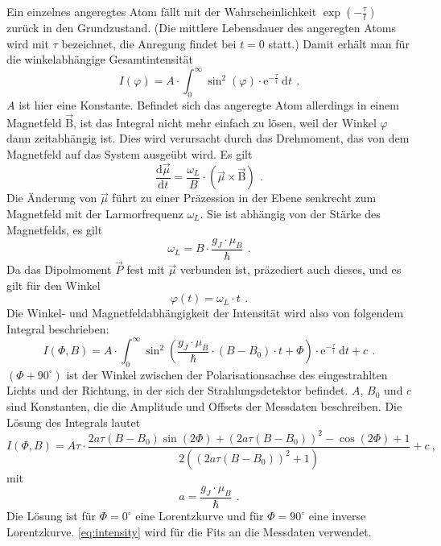 Ein einzelnes angeregtes Atom fällt mit der Wahrscheinlichkeit $\exp(-\frac{\tau}{t})$ zurück in den Grundzustand.
(Die mittlere Lebensdauer des angeregten Atoms wird mit $\tau$ bezeichnet, die Anregung findet bei $t = 0$ statt.)
Damit erhält man für die winkelabhängige Gesamtintensität
\begin{equation}
\label{eq:int}
I(\varphi) = A \cdot \int_0^{\infty} \sin^2(\varphi) \cdot \text{e}^{-\frac{\tau}{t}} \ \text{d}t \, \ .
\end{equation}
$A$ ist hier eine Konstante. Befindet sich das angeregte Atom allerdings in einem Magnetfeld $\vec{\text{B}}$,
ist das Integral nicht mehr einfach zu lösen, weil der Winkel $\varphi$ dann zeitabhängig ist.
Dies wird verursacht durch das Drehmoment, das von dem Magnetfeld auf das System ausgeübt wird.
Es gilt
\begin{equation}
\label{eq:dmu}
\frac{\text{d}\vec{\mu}}{\text{d}t} = \frac{\omega_L}{B} \cdot (\vec{\mu} \times \vec{\text{B}}) \ \, .
\end{equation}
Die Änderung von $\vec{\mu}$  führt zu einer Präzession in der Ebene senkrecht zum Magnetfeld
mit der Larmorfrequenz $\omega_L$.
Sie ist abhängig von der Stärke des Magnetfelds, es gilt
\begin{equation}
\label{eq:larmorfreq}
\omega_L = B \cdot \frac{g_J \cdot \mu_B}{\hbar} \ \, .
\end{equation}
Da das Dipolmoment $\vec{P}$ fest mit $\vec{\mu}$ verbunden ist, präzediert auch dieses, und es gilt für den
Winkel
\begin{equation}
\label{eq:phit}
\varphi(t) = \omega_L \cdot t \ \, .
\end{equation}
Die Winkel- und Magnetfeldabhängigkeit der Intensität wird also von folgendem Integral beschrieben:
\begin{equation}
\label{}
I(\Phi,B) = A \cdot \int_0^{\infty} \sin^2 \left( \frac{g_J \cdot \mu_B}{\hbar} \cdot (B-B_0) \cdot t + \Phi \right) \cdot
\text{e}^{-\frac{\tau}{t}} \ \text{d}t + c \, \ .
\end{equation}
$(\Phi + 90^{\circ})$ ist der Winkel zwischen der Polarisationsachse des eingestrahlten Lichts und der Richtung,
in der sich der Strahlungsdetektor befindet.
$A$, $B_0$ und $c$ sind Konstanten, die die Amplitude und Offsets der Messdaten beschreiben.
Die Lösung des Integrals lautet
\begin{equation}
\label{eq:intensity}
I(\Phi,B) = A \tau \cdot \frac{2 a \tau  (B-B_0) \sin (2 \Phi )+(2 a \tau  (B-B_0))^2-\cos (2 \Phi )+1}
{2 \left((2 a \tau  (B-B_0))^2+1\right)}+c \ ,
\end{equation}
mit
\begin{equation}
\label{}
a=\frac{g_J \cdot \mu_B}{\hbar} \, \ .
\end{equation}
Die Lösung ist für $\Phi=0^{\circ}$ eine Lorentzkurve und für $\Phi=90^{\circ}$ eine inverse Lorentzkurve.
\autoref{eq:intensity} wird für die Fits an die Messdaten verwendet.

